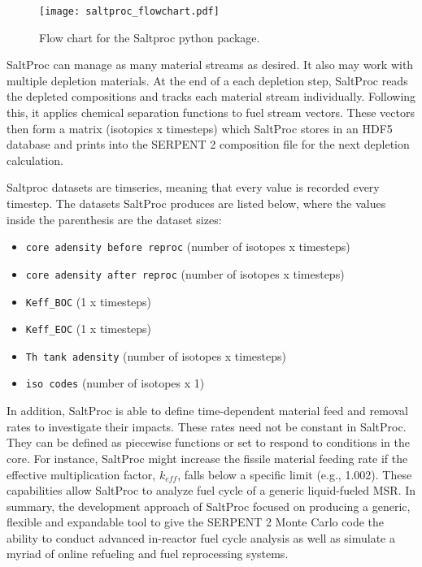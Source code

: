 \begin{figure}[ht!] %
  \texttt{[image: saltproc\_flowchart.pdf]}
  \caption{Flow chart for the Saltproc python package.}
  \label{fig:saltproc_flow}
\end{figure}
SaltProc can manage as many material streams as desired. It also may work with 
multiple depletion materials. At the end of a each depletion step, SaltProc 
reads the depleted compositions and tracks each material stream individually. 
Following this, it applies chemical separation functions to fuel stream 
vectors. These vectors then form a matrix (isotopics x timesteps) which 
SaltProc stores in an HDF5 database and prints into the SERPENT 2 composition 
file for the next depletion calculation.

Saltproc datasets are timseries, meaning that every value is recorded every 
timestep. The datasets SaltProc produces are listed below,
where the values inside the parenthesis are the dataset sizes:

\begin{itemize}
    \item \texttt{core adensity before reproc} (number of isotopes x timesteps)
    \item \texttt{core adensity after reproc} (number of isotopes x timesteps)
    \item \texttt{Keff\_BOC} (1 x timesteps)
    \item \texttt{Keff\_EOC} (1 x timesteps)
    \item \texttt{Th tank adensity} (number of isotopes x timesteps)
    \item \texttt{iso codes} (number of isotopes x 1)
\end{itemize}

In addition, SaltProc is able to define time-dependent material feed and 
removal rates to investigate their impacts. These rates need not be 
constant in SaltProc. They can be defined as piecewise functions or set to 
respond to conditions in the core. For instance, SaltProc might increase the 
fissile material feeding rate if the effective multiplication factor, 
$k_{eff}$, falls below a specific limit (e.g., 1.002).
These capabilities allow SaltProc to analyze fuel cycle of a generic 
liquid-fueled \gls{MSR}. In summary, the development approach of SaltProc 
focused on producing a generic, flexible and expandable tool to give the 
SERPENT 2 Monte Carlo code the ability to conduct advanced in-reactor fuel 
cycle analysis as well as simulate a myriad of online refueling and fuel 
reprocessing systems.